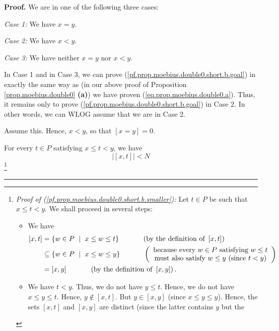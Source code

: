\documentclass[numbers=enddot,12pt,final,onecolumn,notitlepage]{scrartcl}%
\theoremstyle{definition}
\newenvironment{proof}[1][Proof]{\noindent\textbf{#1.} }{\ \rule{0.5em}{0.5em}}
\newenvironment{vershort}{}{}
\begin{document}
\begin{vershort}
\begin{proof}
We are in one of the following three cases:

\textit{Case 1:} We have $x=y$.

\textit{Case 2:} We have $x<y$.

\textit{Case 3:} We have neither $x=y$ nor $x<y$.

In Case 1 and in Case 3, we can prove
(\ref{pf.prop.moebius.double0.short.b.goal}) in exactly the same way as (in
our above proof of Proposition \ref{prop.moebius.double0} \textbf{(a)}) we
have proven (\ref{eq.prop.moebius.double0.a}). Thus, it remains only to prove
(\ref{pf.prop.moebius.double0.short.b.goal}) in Case 2. In other words, we can
WLOG assume that we are in Case 2.

Assume this. Hence, $x<y$, so that $\left[  x=y\right]  =0$.

For every $t\in P$ satisfying $x\leq t<y$, we have%
\begin{equation}
\left\vert \left[  x,t\right]  \right\vert <N
\label{pf.prop.moebius.double0.short.b.smaller}%
\end{equation}
\footnote{\textit{Proof of (\ref{pf.prop.moebius.double0.short.b.smaller}):}
Let $t\in P$ be such that $x\leq t<y$. We shall proceed in several steps:
\par
\begin{itemize}
\item We have
\begin{align*}
\left[  x,t\right]   &  =\left\{  w\in P\ \mid\ x\leq w\leq t\right\}
\ \ \ \ \ \ \ \ \ \ \left(  \text{by the definition of }\left[  x,t\right]
\right) \\
&  \subseteq\left\{  w\in P\ \mid\ x\leq w\leq y\right\}
\ \ \ \ \ \ \ \ \ \ \left(
\begin{array}
[c]{c}%
\text{because every }w\in P\text{ satisfying }w\leq t\\
\text{must also satisfy }w\leq y\text{ (since }t<y\text{)}%
\end{array}
\right) \\
&  =\left[  x,y\right]  \ \ \ \ \ \ \ \ \ \ \left(  \text{by the definition of
}\left[  x,y\right]  \right)  .
\end{align*}
\par
\item We have $t<y$. Thus, we do not have $y\leq t$. Hence, we do not have
$x\leq y\leq t$. Hence, $y\notin\left[  x,t\right]  $. But $y\in\left[
x,y\right]  $ (since $x\leq y\leq y$). Hence, the sets $\left[  x,t\right]  $
and $\left[  x,y\right]  $ are distinct (since the latter contains $y$ but the

\end{itemize}}
\end{proof}
\end{vershort}
\end{document}
